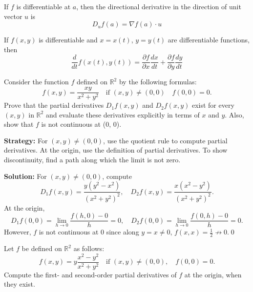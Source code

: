 \begin{theorem}
If $f$ is differentiable at $a$, then the directional derivative in the direction of unit vector $u$ is
\[ D_u f(a) = \nabla f(a) \cdot u \]
\end{theorem}

\begin{theorem}
If $f(x,y)$ is differentiable and $x = x(t)$, $y = y(t)$ are differentiable functions, then
\[ \frac{d}{dt}f(x(t), y(t)) = \frac{\partial f}{\partial x}\frac{dx}{dt} + \frac{\partial f}{\partial y}\frac{dy}{dt} \]
\end{theorem}

\begin{problembox}
\begin{problemstatement}
Consider the function \( f \) defined on \( \mathbb{R}^2 \) by the following formulas:
\[ f(x, y) = \frac{xy}{x^2 + y^2} \quad \text{if } (x, y) \neq (0, 0) \quad f(0, 0) = 0. \]
Prove that the partial derivatives \( D_1 f(x, y) \) and \( D_2 f(x, y) \) exist for every \( (x, y) \) in \( \mathbb{R}^2 \) and evaluate these derivatives explicitly in terms of \( x \) and \( y \). Also, show that \( f \) is not continuous at (0, 0).
\end{problemstatement}
\end{problembox}

\noindent\textbf{Strategy:} For \( (x, y) \neq (0, 0) \), use the quotient rule to compute partial derivatives. At the origin, use the definition of partial derivatives. To show discontinuity, find a path along which the limit is not zero.

\bigskip\noindent\textbf{Solution:}
For $(x,y)\ne(0,0)$, compute
\[D_1f(x,y)=\frac{y(y^2-x^2)}{(x^2+y^2)^2},\quad D_2f(x,y)=\frac{x(x^2-y^2)}{(x^2+y^2)^2}.\]
At the origin,
\[D_1f(0,0)=\lim_{h\to 0}\frac{f(h,0)-0}{h}=0,\quad D_2f(0,0)=\lim_{h\to 0}\frac{f(0,h)-0}{h}=0.\]
However, $f$ is not continuous at $0$ since along $y=x\ne 0$, $f(x,x)=\tfrac12\not\to 0$.\qed


\begin{problembox}
\begin{problemstatement}
Let \( f \) be defined on \( \mathbb{R}^2 \) as follows:
\[ f(x, y) = y \frac{x^2 - y^2}{x^2 + y^2} \quad \text{if } (x, y) \neq (0, 0), \quad f(0, 0) = 0. \]
Compute the first- and second-order partial derivatives of \( f \) at the origin, when they exist.
\end{problemstatement}
\end{problembox}

